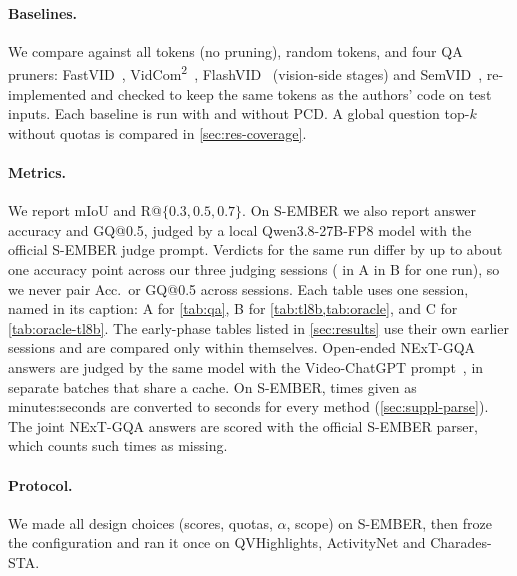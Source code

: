 \paragraph{Baselines.}
We compare against all tokens (no pruning), random tokens, and four QA pruners: FastVID~\cite{fastvid},
VidCom\textsuperscript{2}~\cite{vidcom2}, FlashVID~\cite{flashvid} (vision-side stages) and SemVID~\cite{semvid},
re-implemented and checked to keep the same tokens as the authors' code on test inputs. Each baseline is run with
and without PCD. A global question top-$k$ without quotas is compared in \cref{sec:res-coverage}.

\paragraph{Metrics.}
We report mIoU and R@$\{0.3,0.5,0.7\}$. On S-EMBER we also report answer accuracy and GQ@0.5, judged by a local
Qwen3.8-27B-FP8 model with the official S-EMBER judge prompt. Verdicts for the same run differ by up to about one accuracy point across our three judging sessions (
in A  in B for one \method run), so we never pair Acc.\ or GQ@0.5 across sessions. Each table uses one session, named
in its caption: A for \cref{tab:qa}, B for \cref{tab:tl8b,tab:oracle}, and C for \cref{tab:oracle-tl8b}. The
early-phase tables listed in \cref{sec:results} use their own earlier sessions and are compared only within
themselves. Open-ended NExT-GQA answers are judged by the same model with the Video-ChatGPT
prompt~\cite{videochatgpt}, in separate batches that share a cache. On S-EMBER, times given as minutes:seconds are
converted to seconds for every method (\cref{sec:suppl-parse}). The joint NExT-GQA answers are scored with the
official S-EMBER parser, which counts such times as missing.

\paragraph{Protocol.}
We made all design choices (scores, quotas, $\alpha$, scope) on S-EMBER, then froze the configuration and ran it
once on QVHighlights, ActivityNet and Charades-STA. 
